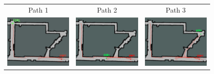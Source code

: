 \documentclass{article}
\begin{document}
\begin{figure}[h]
\begin{center}
\begin{tabular}{c|c|c}
    Path 1 & Path 2 & Path 3 \\
    \includegraphics[scale=.08]{path1.png} & 
    \includegraphics[scale=.07]{path2.png} & 
    \includegraphics[scale=.07]{path3.png} 

\end{tabular}
\end{center}
\end{figure}
\end{document}
